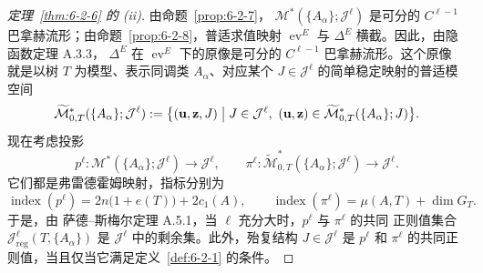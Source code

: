 \begin{proof}[定理~\ref{thm:6-2-6} 的 (ii)]
由命题~\ref{prop:6-2-7}，
$\mathcal M^*(\{A_\alpha\};\mathcal J^\ell)$ 是可分的
$C^{\ell-1}$ 巴拿赫流形；由命题~\ref{prop:6-2-8}，普适求值映射
$\operatorname{ev}^E$ 与 $\Delta^E$ 横截。因此，由隐函数定理 A.3.3，
$\Delta^E$ 在 $\operatorname{ev}^E$ 下的原像是可分的 $C^{\ell-1}$ 巴拿赫流形。这个原像
就是以树 $T$ 为模型、表示同调类 $A_\alpha$、对应某个
$J\in\mathcal J^\ell$ 的简单稳定映射的普适模空间
\begin{equation}\label{eq:6-2-4}
  \widetilde{\mathcal M}^*_{0,T}(\{A_\alpha\};\mathcal J^\ell)
  :=\bigl\{(\mathbf u,\mathbf z,J)\bigm|
  J\in\mathcal J^\ell,
  \ (\mathbf u,\mathbf z)\in
  \widetilde{\mathcal M}^*_{0,T}(\{A_\alpha\};J)\bigr\}.
\end{equation}
现在考虑投影
\[
  p^\ell:\mathcal M^*(\{A_\alpha\};\mathcal J^\ell)
  \longrightarrow\mathcal J^\ell,
  \qquad
  \pi^\ell:\widetilde{\mathcal M}^*_{0,T}
  (\{A_\alpha\};\mathcal J^\ell)\longrightarrow\mathcal J^\ell.
\]
它们都是弗雷德霍姆映射，指标分别为
\[
  \operatorname{index}(p^\ell)
  =2n\bigl(1+e(T)\bigr)+2c_1(A),
  \qquad
  \operatorname{index}(\pi^\ell)=\mu(A,T)+\dim G_T.
\]
于是，由 萨德--斯梅尔定理 A.5.1，当 $\ell$ 充分大时，$p^\ell$ 与 $\pi^\ell$ 的共同
正则值集合
$\mathcal J^\ell_{\mathrm{reg}}(T,\{A_\alpha\})$ 是
$\mathcal J^\ell$ 中的剩余集。此外，殆复结构 $J\in\mathcal J^\ell$ 是
$p^\ell$ 和 $\pi^\ell$ 的共同正则值，当且仅当它满足定义~\ref{def:6-2-1} 的条件。


\end{proof}
